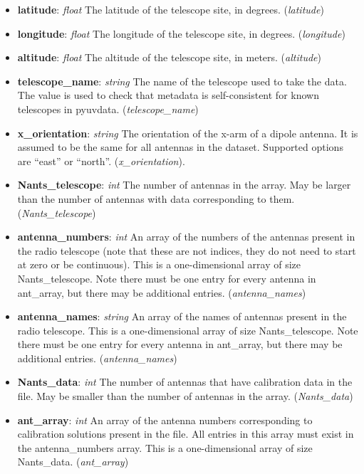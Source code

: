 \documentclass[11pt, oneside]{article}
\begin{document}
\begin{itemize}
\item \textbf{latitude}: \textit{float} The latitude of the telescope site, in
  degrees. (\textit{latitude})
\item \textbf{longitude}: \textit{float} The longitude of the telescope site, in
  degrees. (\textit{longitude})
\item \textbf{altitude}: \textit{float} The altitude of the telescope site, in
  meters. (\textit{altitude})
\item \textbf{telescope\_name}: \textit{string} The name of the telescope used
  to take the data. The value is used to check that metadata is self-consistent
  for known telescopes in pyuvdata. (\textit{telescope\_name})
\item \textbf{x\_orientation}: \textit{string} The orientation of the x-arm of a
  dipole antenna. It is assumed to be the same for all antennas in the
  dataset. Supported options are ``east'' or ``north''. (\textit{x\_orientation}).

\item \textbf{Nants\_telescope}: \textit{int} The number of antennas in the
  array. May be larger than the number of antennas with data corresponding to
  them. (\textit{Nants\_telescope})
\item \textbf{antenna\_numbers}: \textit{int} An array of the numbers of the antennas
  present in the radio telescope (note that these are not indices, they do not need to start at zero
  or be continuous). This is a one-dimensional array of size
  Nants\_telescope. Note there must be one entry for every antenna in
  ant\_array, but there may be additional entries. (\textit{antenna\_names})
\item \textbf{antenna\_names}: \textit{string} An array of the names of antennas
  present in the radio telescope. This is a one-dimensional array of size
  Nants\_telescope. Note there must be one entry for every antenna in
  ant\_array, but there may be additional entries. (\textit{antenna\_names})

\item \textbf{Nants\_data}: \textit{int} The number of antennas that have
  calibration data in the file. May be smaller than the number of antennas in the
  array. (\textit{Nants\_data})
\item \textbf{ant\_array}: \textit{int} An array of the antenna numbers
  corresponding to calibration solutions present in the file. All entries in this
  array must exist in the antenna\_numbers array. This is a one-dimensional
  array of size Nants\_data. (\textit{ant\_array})


\end{itemize}
\end{document}
